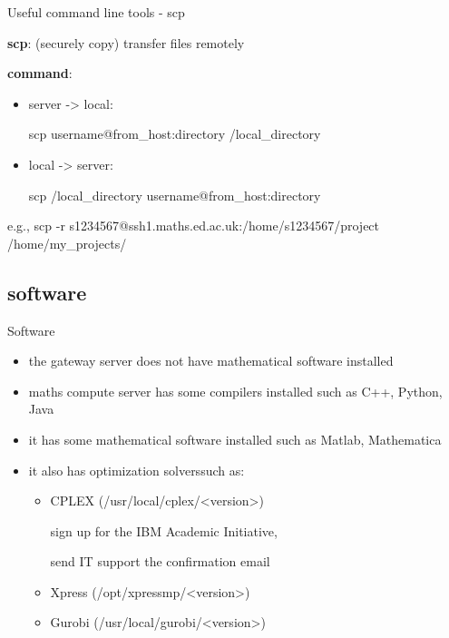 \documentclass[10pt]{beamer}
\begin{document}
\begin{frame}[fragile]{Useful command line tools - scp}

\textbf{scp}: (securely copy) transfer files remotely

\hfill

\textbf{command}: 
\begin{itemize}
    \item {server -> local: 
    
    scp username@from\_host:directory /local\_directory}
    \item {local -> server: 
    
    scp /local\_directory username@from\_host:directory}
\end{itemize}

\quad e.g., scp -r s1234567@ssh1.maths.ed.ac.uk:/home/s1234567/project /home/my\_projects/

\end{frame}

\subsection{software}

\begin{frame}[fragile]{Software}

\begin{itemize}
    \item the gateway server does not have mathematical software installed
    \item maths compute server has some compilers installed such as C++, Python, Java 
    \item it has some mathematical software installed such as Matlab, Mathematica
    \item it also has optimization solvers\footnotemark such as: 
        \begin{itemize}
            \item {CPLEX (/usr/local/cplex/<version>)
            
            sign up for the IBM Academic Initiative, 
            
            send IT support the confirmation email}
            \item Xpress (/opt/xpressmp/<version>)
            \item Gurobi (/usr/local/gurobi/<version>)
        \end{itemize}
\end{itemize}


\end{frame}
\end{document}
